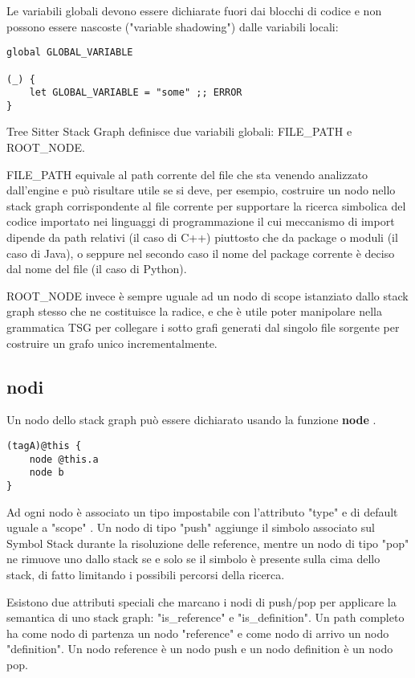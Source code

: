 Le variabili globali devono essere dichiarate fuori dai blocchi di codice e non possono essere nascoste ("variable shadowing") dalle variabili locali:

\begin{lstlisting}
global GLOBAL_VARIABLE

(_) {
    let GLOBAL_VARIABLE = "some" ;; ERROR
}
\end{lstlisting}

Tree Sitter Stack Graph definisce due variabili globali: FILE\_PATH e ROOT\_NODE.

FILE\_PATH equivale al path corrente del file che sta venendo analizzato dall'engine e pu\`o risultare utile se si deve, per esempio, costruire un nodo nello stack graph corrispondente al file corrente per supportare la ricerca simbolica del codice importato nei linguaggi di programmazione il cui meccanismo di import dipende da path relativi (il caso di C++) piuttosto che da package o moduli (il caso di Java), o seppure nel secondo caso il nome del package corrente \`e deciso dal nome del file (il caso di Python).

ROOT\_NODE invece \`e sempre uguale ad un nodo di scope istanziato dallo stack graph stesso che ne costituisce la radice, e che \`e utile poter manipolare nella grammatica TSG per collegare i sotto grafi generati dal singolo file sorgente per costruire un grafo unico incrementalmente.

\subsection{nodi}

Un nodo dello stack graph pu\`o essere dichiarato usando la funzione \textbf{node} \cite{TreeSitterGraphReferenceGraphNodes}.

\begin{lstlisting}
(tagA)@this {
    node @this.a
    node b
}
\end{lstlisting}

Ad ogni nodo \`e associato un tipo impostabile con l'attributo "type" e di default uguale a "scope" \cite{TreeSitterStackGraphNodes}.
Un nodo di tipo "push" aggiunge il simbolo associato sul Symbol Stack durante la risoluzione delle reference, mentre un nodo di tipo "pop" ne rimuove uno dallo stack se e solo se il simbolo \`e presente sulla cima dello stack, di fatto limitando i possibili percorsi della ricerca.

Esistono due attributi speciali che marcano i nodi di push/pop per applicare la semantica di uno stack graph: "is\_reference" e "is\_definition".
Un path completo ha come nodo di partenza un nodo "reference" e come nodo di arrivo un nodo "definition".
Un nodo reference \`e un nodo push e un nodo definition \`e un nodo pop.

